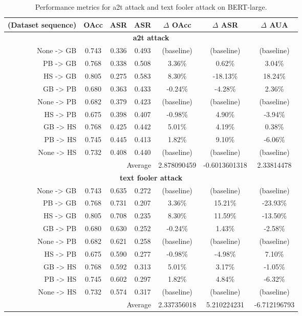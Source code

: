 \documentclass{article}
\begin{document}
\begin{table}[ht]
\centering
\caption{Performance metrics for a2t attack and text fooler attack on BERT-large.}
\small
\begin{tabular}{r|ccc|ccc}
\hline
\textbf{(Dataset sequence)} & \textbf{OAcc} & \textbf{ASR} & \textbf{ASR} & \textbf{$\Delta$ OAcc} & \textbf{$\Delta$ ASR} & \textbf{$\Delta$ AUA} \\ \hline
\multicolumn{7}{c}{\textbf{a2t attack}} \\ \hline
None -> GB & 0.743 & 0.336 & 0.493 & (baseline) & (baseline) & (baseline) \\
PB -> GB & 0.768 & 0.338 & 0.508 & 3.36\% & 0.62\% & 3.04\% \\
HS -> GB & 0.805 & 0.275 & 0.583 & 8.30\% & -18.13\% & 18.24\% \\
GB -> PB & 0.680 & 0.363 & 0.433 & -0.24\% & -4.28\% & 2.36\% \\
None -> PB & 0.682 & 0.379 & 0.423 & (baseline) & (baseline) & (baseline) \\
HS -> PB & 0.675 & 0.398 & 0.407 & -0.98\% & 4.90\% & -3.94\% \\
GB -> HS & 0.768 & 0.425 & 0.442 & 5.01\% & 4.19\% & 0.38\% \\
PB -> HS & 0.745 & 0.445 & 0.413 & 1.82\% & 9.10\% & -6.06\% \\
None -> HS & 0.732 & 0.408 & 0.440 & (baseline) & (baseline) & (baseline) \\ \hline
\multicolumn{4}{r|}{Average} & 2.878090459 & -0.6013601318 & 2.33814478 \\ \hline
\multicolumn{7}{c}{\textbf{text fooler attack}} \\ \hline
None -> GB & 0.743 & 0.635 & 0.272 & (baseline) & (baseline) & (baseline) \\
PB -> GB & 0.768 & 0.731 & 0.207 & 3.36\% & 15.21\% & -23.93\% \\
HS -> GB & 0.805 & 0.708 & 0.235 & 8.30\% & 11.59\% & -13.50\% \\
GB -> PB & 0.680 & 0.630 & 0.252 & -0.24\% & 1.43\% & -2.58\% \\
None -> PB & 0.682 & 0.621 & 0.258 & (baseline) & (baseline) & (baseline) \\
HS -> PB & 0.675 & 0.590 & 0.277 & -0.98\% & -4.98\% & 7.10\% \\
GB -> HS & 0.768 & 0.592 & 0.313 & 5.01\% & 3.17\% & -1.05\% \\
PB -> HS & 0.745 & 0.602 & 0.297 & 1.82\% & 4.84\% & -6.32\% \\
None -> HS & 0.732 & 0.574 & 0.317 & (baseline) & (baseline) & (baseline) \\ \hline
\multicolumn{4}{r|}{Average} & 2.337356018 & 5.210224231 & -6.712196793 \\ \hline
\end{tabular}
\label{table:bert_large_attack_comparison}
\end{table}
\end{document}
